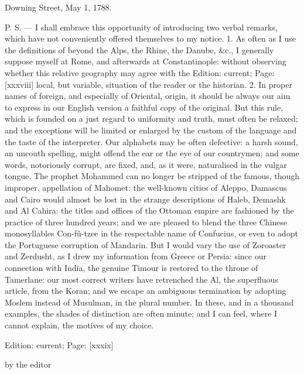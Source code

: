 Downing Street, May 1, 1788.

P. S. \texthebrew{—} I shall embrace this opportunity of introducing two verbal remarks, which have not conveniently offered themselves to my notice. 1. As often as I use the definitions of beyond the Alps, the Rhine, the Danube, \&c., I generally suppose myself at Rome, and afterwards at Constantinople: without observing whether this relative geography may agree with the Edition: current; Page: [xxxviii] local, but variable, situation of the reader or the historian. 2. In proper names of foreign, and especially of Oriental, origin, it should be always our aim to express in our English version a faithful copy of the original. But this rule, which is founded on a just regard to uniformity and truth, must often be relaxed; and the exceptions will be limited or enlarged by the custom of the language and the taste of the interpreter. Our alphabets may be often defective: a harsh sound, an uncouth spelling, might offend the ear or the eye of our countrymen; and some words, notoriously corrupt, are fixed, and, as it were, naturalised in the vulgar tongue. The prophet Mohammed can no longer be stripped of the famous, though improper, appellation of Mahomet: the well-known cities of Aleppo, Damascus and Cairo would almost be lost in the strange descriptions of Haleb, Demashk and Al Cahira: the titles and offices of the Ottoman empire are fashioned by the practice of three hundred years; and we are pleased to blend the three Chinese monosyllables Con-fû-tzee in the respectable name of Confucius, or even to adopt the Portuguese corruption of Mandarin. But I would vary the use of Zoroaster and Zerdusht, as I drew my information from Greece or Persia: since our connection with India, the genuine Timour is restored to the throne of Tamerlane: our most correct writers have retrenched the Al, the superfluous article, from the Koran; and we escape an ambiguous termination by adopting Moslem instead of Musulman, in the plural number. In these, and in a thousand examples, the shades of distinction are often minute; and I can feel, where I cannot explain, the motives of my choice.

Edition: current; Page: [xxxix]


by the editor

